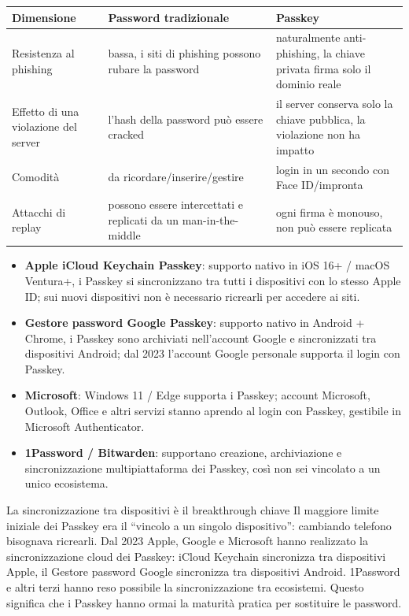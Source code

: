 \begin{center}
\begin{tabularx}{\linewidth}{|X|X|X|}
\hline
\textbf{Dimensione} & \textbf{Password tradizionale} & \textbf{Passkey} \tabularnewline
\hline
Resistenza al phishing & bassa, i siti di phishing possono rubare la password & naturalmente anti-phishing, la chiave privata firma solo il dominio reale \tabularnewline
Effetto di una violazione del server & l'hash della password può essere cracked & il server conserva solo la chiave pubblica, la violazione non ha impatto \tabularnewline
Comodità & da ricordare/inserire/gestire & login in un secondo con Face ID/impronta \tabularnewline
Attacchi di replay & possono essere intercettati e replicati da un man-in-the-middle & ogni firma è monouso, non può essere replicata \tabularnewline
\hline
\end{tabularx}
\end{center}


\begin{itemize}
  \item \textbf{Apple iCloud Keychain Passkey}: supporto nativo in iOS 16+ / macOS Ventura+, i Passkey si sincronizzano tra tutti i dispositivi con lo stesso Apple ID; sui nuovi dispositivi non è necessario ricrearli per accedere ai siti.
  \item \textbf{Gestore password Google Passkey}: supporto nativo in Android + Chrome, i Passkey sono archiviati nell'account Google e sincronizzati tra dispositivi Android; dal 2023 l'account Google personale supporta il login con Passkey.
  \item \textbf{Microsoft}: Windows 11 / Edge supporta i Passkey; account Microsoft, Outlook, Office e altri servizi stanno aprendo al login con Passkey, gestibile in Microsoft Authenticator.
  \item \textbf{1Password / Bitwarden}: supportano creazione, archiviazione e sincronizzazione multipiattaforma dei Passkey, così non sei vincolato a un unico ecosistema.
\end{itemize}

\begin{tcbinfo}{La sincronizzazione tra dispositivi è il breakthrough chiave}
Il maggiore limite iniziale dei Passkey era il “vincolo a un singolo dispositivo”: cambiando telefono bisognava ricrearli. Dal 2023 Apple, Google e Microsoft hanno realizzato la sincronizzazione cloud dei Passkey: iCloud Keychain sincronizza tra dispositivi Apple, il Gestore password Google sincronizza tra dispositivi Android. 1Password e altri terzi hanno reso possibile la sincronizzazione tra ecosistemi. Questo significa che i Passkey hanno ormai la maturità pratica per sostituire le password.

\end{tcbinfo}

